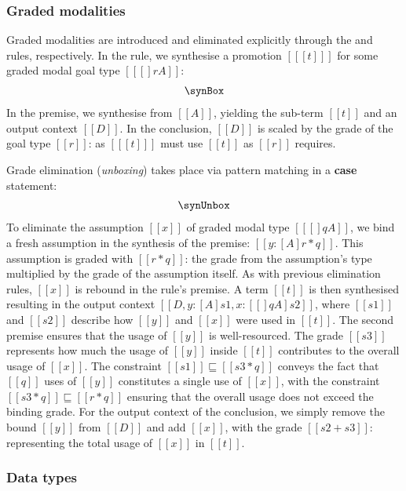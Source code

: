 \subsubsection{Graded modalities}

Graded modalities are introduced and eliminated explicitly through the
\GRANULEdruleBoxName and \GRANULEdruleUnboxName rules, respectively. In the
\GRANULEdruleBoxName{} rule, we synthesise a promotion $[[ [ t ] ]]$ for some graded
modal goal type $[[ [] r A ]]$:
\begin{align*}
  \synBox
\end{align*}
In the premise, we synthesise from $[[ A ]]$, yielding the sub-term $[[ t ]]$ and
an output context $[[ D ]]$. In the conclusion, $[[ D ]]$ is scaled by the grade
of the goal type $[[ r ]]$: as $[[ [t] ]]$ must use $[[ t ]]$ as $[[ r ]]$
requires.

Grade elimination (\textit{unboxing}) takes place via
pattern matching in a \textbf{case} statement:
\begin{align*}
  \synUnbox
\end{align*}
To eliminate the assumption $[[ x ]]$ of graded modal type $[[ [] q
A ]]$, we bind a fresh assumption in the synthesis of the premise: $[[ y : [A]
{r * q} ]]$. This assumption is graded with $[[ {r * q} ]]$: the grade from the
assumption's type multiplied by the grade of the assumption itself. As with
previous elimination rules, $[[ x ]]$ is rebound in the rule's premise. A
term $[[ t ]]$ is then synthesised resulting in the output context $[[ {D, y :
[A] s1}, x : [ [] q A ] {s2} ]]$, where $[[ s1 ]]$ and $[[ s2 ]]$ describe how
$[[ y ]]$ and $[[ x ]]$ were used in $[[ t ]]$. The second premise ensures that
the usage of $[[ y ]]$ is well-resourced. The grade $[[ s3 ]]$ represents how
much the usage of $[[ y ]]$ inside $[[ t]]$ contributes to the overall usage of
$ [[ x]]$. The constraint $[[ s1 ]] \sqsubseteq [[ s3 * q ]]$ conveys the fact
that $[[ q ]]$ uses of $[[y]]$ constitutes a single use of $[[ x ]]$, with the constraint
$[[ s3 * q ]] \sqsubseteq [[r * q]]$ ensuring that the overall usage does not exceed the binding grade. For the
output context of the conclusion, we simply remove the bound $[[y]]$ from $[[ D
]]$ and add $[[ x ]]$, with the grade $[[ s2 + s3 ]]$: representing the total
usage of $[[ x ]]$ in $[[ t ]]$.

\subsubsection{Data types}

